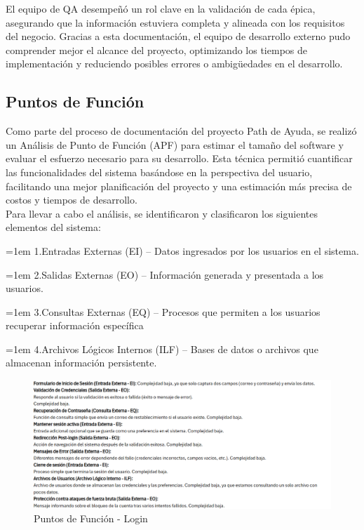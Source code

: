 \documentclass[12pt,letterpaper,spanish, xcolor=table]{report}
\numberwithin{figure}{subsection}
\begin{document}
	El equipo de QA desempeñó un rol clave en la validación de cada épica, asegurando que la información estuviera completa y alineada con los requisitos del negocio. Gracias a esta documentación, el equipo de desarrollo externo pudo comprender mejor el alcance del proyecto, optimizando los tiempos de implementación y reduciendo posibles errores o ambigüedades en el desarrollo.
	
\subsection{Puntos de Función}

	Como parte del proceso de documentación del proyecto Path de Ayuda, se realizó un Análisis de Punto de Función (APF) para estimar el tamaño del software y evaluar el esfuerzo necesario para su desarrollo. Esta técnica permitió cuantificar las funcionalidades del sistema basándose en la perspectiva del usuario, facilitando una mejor planificación del proyecto y una estimación más precisa de costos y tiempos de desarrollo.\\
	
	Para llevar a cabo el análisis, se identificaron y clasificaron los siguientes elementos del sistema:\\
	
	{\leftskip=1em 
	  \noindent 
		1.Entradas Externas (EI) – Datos ingresados por los usuarios en el sistema.
	\par}
	
	{\leftskip=1em 
	  \noindent 
		2.Salidas Externas (EO) – Información generada y presentada a los usuarios.
	\par}
	
	{\leftskip=1em 
	  \noindent 
		3.Consultas Externas (EQ) – Procesos que permiten a los usuarios recuperar información específica
	\par}

	{\leftskip=1em 
	  \noindent 
		4.Archivos Lógicos Internos (ILF) – Bases de datos o archivos que almacenan información persistente.
	\par}

	\begin{figure}[htp]
		\centering
		\includegraphics[width=1.0\textwidth]
		{Imagenes/PathAyuda/FpsLogin.png}
		\caption{Puntos de Función - Login}\label{a1}
	\end{figure}
	
\end{document}
